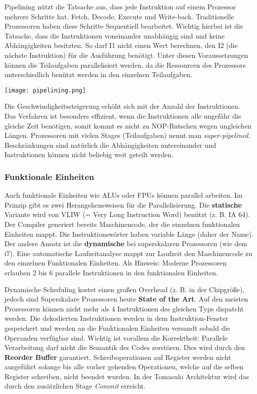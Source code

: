 Pipelining nützt die Tatsache aus, dass jede Instruktion auf einem Prozessor
mehrere Schritte hat. Fetch, Decode, Execute und Write-back. Traditionelle
Prozessoren haben diese Schritte Sequentiell bearbeitet. Wichtig hierbei ist
die Tatsache, dass die Instruktionen voneinander unabhängig sind und keine
Abhängigkeiten besitzten. So darf I1 nicht einen Wert berechnen, den I2 (die
nächste Instruktion) für die Ausführung benötigt. Unter diesen Voraussetzungen
können die Teilaufgaben parallelisiert werden, da die Ressourcen des Prozessors
unterschiedlich benützt werden in den einzelnen Teilaufgaben.

\begin{center}
	\texttt{[image: pipelining.png]}
\end{center}

Die Geschwindigkeitssteigerung erhöht sich mit der Anzahl der Instruktionen.
Das Verfahren ist besonders effizient, wenn die Instruktionen alle ungefähr die
gleiche Zeit benötigen, somit kommt es nicht zu NOP-Rutschen wegen ungleichen 
Längen. Prozessoren mit vielen Stages (Teilaufgaben) nennt man \textit{super-pipelined}.
Beschränkungen sind natürlich die Abhängigkeiten untereinander und Instruktionen
können nicht beliebig weit geteilt werden.

\subsubsection{Funktionale Einheiten}
Auch funktionale Einheiten wie ALUs oder FPUs können parallel arbeiten. Im Prinzip
gibt es zwei Herangehensweisen für die Parallelisierung. Die \textbf{statische}
Variante wird von VLIW (= Very Long Instruction Word) benützt (z. B. IA 64). 
Der Compiler generiert bereits Maschinencode, der die einzelnen funktionalen
Einheiten mappt. Die Instruktionswörter haben variable Länge (daher der Name).
Der andere Ansatz ist die \textbf{dynamische} bei superskalaren Prozessoren (wie dem i7). 
Eine automatische Laufzeitanalyse mappt zur Laufzeit den Maschinencode zu den 
einzelnen Funktionalen Einheiten. Als Hinweis: Moderne Prozessoren erlauben
2 bis 6 parallele Instruktionen in den funktionalen Einheiten.

Dynamische Scheduling kostet einen großen Overhead (z. B. in der Chipgröße), jedoch
sind Superskalare Prozessoren heute \textbf{State of the Art}. Auf den meisten
Prozessoren können nicht mehr als 4 Instruktionen des gleichen Typs dispatcht werden.
Die dekodierten Instruktionen werden in dem Instruktion-Fenster gespeichert und
werden an die Funktionalen Einheiten versandt sobald die Operanden verfügbar sind.
Wichtig ist vorallem die Korrektheit: Parallele Verarbeitung darf nicht die
Semantik des Codes zerstören. Dies wird durch den \textbf{Reorder Buffer} garantiert.
Schreiboperationen auf Register werden nicht ausgeführt solange bis alle vorher 
gehenden Operationen, welche auf die selben Register schreiben, nicht beendet wurden.
In der Tomasulo Architektur wird das durch den zusätzlichen Stage \textit{Commit}
erreicht.
